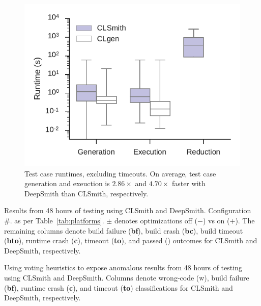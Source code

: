 \begin{figure}
	\centering %
	\includegraphics[width=\columnwidth]{build/img/runtimes}%
	\caption{%
		Test case runtimes, excluding timeouts. On average, test case generation and exeuction is $2.86\times$ and $4.70\times$ faster with DeepSmith than CLSmith, respectively. %
	}%
	\label{fig:runtimes} %
\end{figure}


\begin{table}
	\scriptsize %
	\centering %
	
	\caption{Results from 48 hours of testing using CLSmith and DeepSmith. Configuration \#. as per Table~\ref{tab:platforms}. $\pm$ denotes optimizations off ($-$) vs on ($+$). The remaining columns denote build failure (\textbf{bf}), build crash (\textbf{bc}), build timeout (\textbf{bto}), runtime crash (\textbf{c}), timeout (\textbf{to}), and passed (\textbf{\cmark}) outcomes for CLSmith and DeepSmith, respectively.}
	\label{tab:outcomes}
\end{table}

\begin{table}
	\scriptsize %
	\centering %
	
	\caption{Using voting heuristics to expose anomalous results from 48 hours of testing using CLSmith and DeepSmith. Columns denote wrong-code (w), build failure (\textbf{bf}), runtime crash (\textbf{c}), and timeout (\textbf{to}) classifications for CLSmith and DeepSmith, respectively.}
	\label{tab:classifications}
\end{table}


